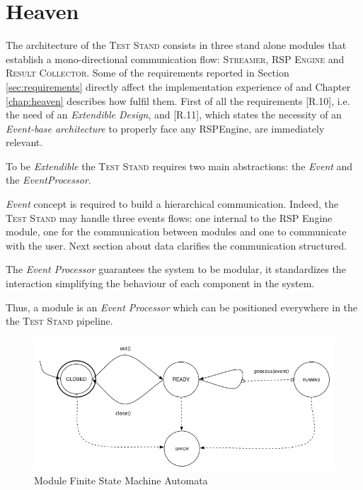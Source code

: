 
\section{Heaven}\label{sec:impl-intro}

The architecture of the \textsc{Test Stand} consists in three stand alone modules that establish a mono-directional communication flow: \textsc{Streamer}, \textsc{RSP Engine} and \textsc{Result Collector}. Some of the requirements reported in Section \ref{sec:requirements} directly affect the implementation experience of \name and Chapter \ref{chap:heaven} describes how fulfil them. First of all the requirements [R.10], i.e. the need of an \textit{Extendible Design}, and [R.11], which states the necessity of an \textit{Event-base architecture} to properly face any RSPEngine, are immediately relevant. 

To be \textit{Extendible} the \textsc{Test Stand} requires two main abstractions: the \textit{Event} and the \textit{EventProcessor}.

\textit{Event} concept is required to build a hierarchical communication. Indeed, the \textsc{Test Stand} may handle three events flows: one internal to the RSP Engine module, one for the communication between modules and one to communicate with the user. Next section about data clarifies the communication structured. 

The \textit{Event Processor} guarantees the system to be modular, it standardizes the interaction simplifying the behaviour of each component in the system. 

Thus, a module is an \textit{Event Processor} which can be positioned everywhere in the the \textsc{Test Stand} pipeline. %

\begin{figure}[tbh]
  \centering
	\includegraphics[width=\linewidth]{images/fsm-schema}
	\caption{Module Finite State Machine Automata} 
  	\label{fig:module-fsm}
\end{figure}


